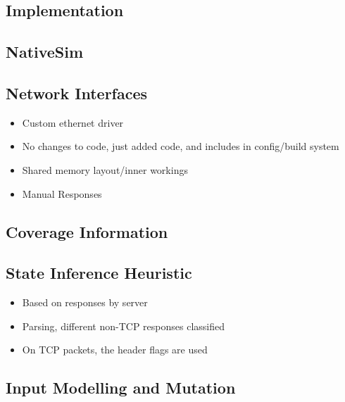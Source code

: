 \documentclass{article}
\newcommand{\code}[2][]{\lstinline[language=#1, breaklines=false, basicstyle=\ttfamily\normalsize]{#2}}
\begin{document}
\begin{multicols}{2}
  \section{Implementation}

  \subsection{NativeSim}
  \subsection{Network Interfaces}
  \begin{itemize}
    \item Custom ethernet driver
    \item No changes to code, just added code, and includes in config/build system
    \item Shared memory layout/inner workings
    \item Manual Responses
  \end{itemize}

  \subsection{Coverage Information}

  \subsection{State Inference Heuristic}
  \begin{itemize}
    \item Based on responses by server
    \item Parsing, different non-TCP responses classified
    \item On TCP packets, the header flags are used
  \end{itemize}

  \subsection{Input Modelling and Mutation}


\end{multicols}
\end{document}
